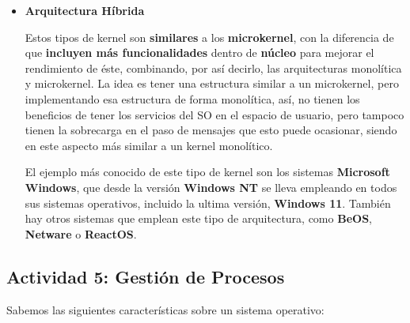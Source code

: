 \begin{itemize}
    \item \textbf{Arquitectura Híbrida}

    Estos tipos de kernel son \textbf{similares} a los \textbf{microkernel}, con la diferencia de que \textbf{incluyen más funcionalidades} dentro de \textbf{núcleo} para mejorar el rendimiento de éste, combinando, por así decirlo, las arquitecturas monolítica y microkernel. La idea es tener una estructura similar a un microkernel, pero implementando esa estructura de forma monolítica, así, no tienen los beneficios de tener los servicios del SO en el espacio de usuario, pero tampoco tienen la sobrecarga en el paso de mensajes que esto puede ocasionar, siendo en este aspecto más similar a un kernel monolítico. \cite{wiki05}

    El ejemplo más conocido de este tipo de kernel son los sistemas \textbf{Microsoft Windows}, que desde la versión \textbf{Windows NT} se lleva empleando en todos sus sistemas operativos, incluido la ultima versión, \textbf{Windows 11}. También hay otros sistemas que emplean este tipo de arquitectura, como \textbf{BeOS}, \textbf{Netware} o \textbf{ReactOS}.
\end{itemize}

\subsection{Actividad 5: Gestión de Procesos}
Sabemos las siguientes características sobre un sistema operativo:

